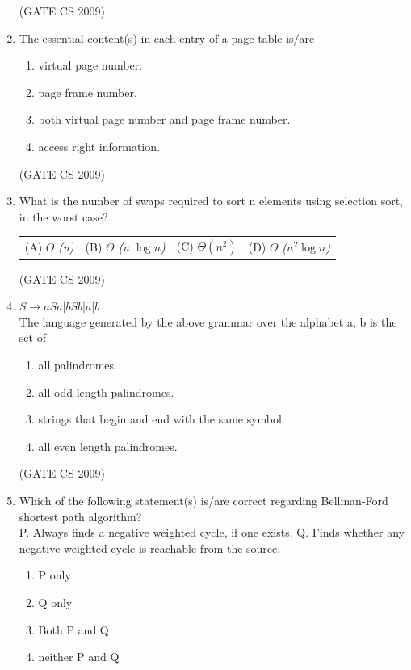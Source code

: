 \documentclass[a4paper, 11pt]{article}
\begin{document}
\begin{enumerate}
    \hfill (GATE CS 2009)

    \item The essential content(s) in each entry of a page table is/are
    \begin{enumerate}[label=(\Alph*)]
        \item virtual page number.
        \item page frame number.
        \item both virtual page number and page frame number.
        \item access right information.
    \end{enumerate}

    \hfill (GATE CS 2009)

    \item What is the number of swaps required to sort n elements using selection sort, in the worst case?\\
    \begin{tabularx}{\textwidth}{@{}XXXX@{}}
    (A) $\Theta$ \textit{(n)} & (B) $\Theta$ \textit{(n $\log n $)} & (C) $\Theta (n^2)$ & (D) $\Theta$ \textit{($n^2 \log n$)}
    \end{tabularx}

    \hfill (GATE CS 2009)

    \item $S \rightarrow aSa | bSb| a | b$\\The language generated by the above grammar over the alphabet {a, b} is the set of
    \begin{enumerate}[label=(\Alph*)]
        \item all palindromes.
        \item all odd length palindromes.
        \item strings that begin and end with the same symbol.
        \item all even length palindromes.
    \end{enumerate}

    \hfill (GATE CS 2009)

    \item Which of the following statement(s) is/are correct regarding Bellman-Ford shortest path algorithm?\\
    P. Always finds a negative weighted cycle, if one exists.
    Q. Finds whether any negative weighted cycle is reachable from the source.
    \begin{enumerate}[label=(\Alph*)]
        \item P only
        \item Q only
        \item Both P and Q
        \item neither P and Q
    \end{enumerate}


\end{enumerate}
\end{document}
